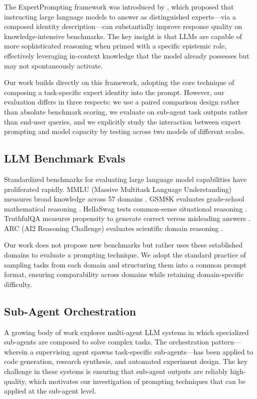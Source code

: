 \documentclass[anonymous, submission, paper]{iclr2026}
\begin{document}
The ExpertPrompting framework was introduced by \citet{expertprompting2023}, which proposed that instructing large language models to answer as distinguished experts---via a composed identity description---can substantially improve response quality on knowledge-intensive benchmarks. The key insight is that LLMs are capable of more sophisticated reasoning when primed with a specific epistemic role, effectively leveraging in-context knowledge that the model already possesses but may not spontaneously activate.

Our work builds directly on this framework, adopting the core technique of composing a task-specific expert identity into the prompt. However, our evaluation differs in three respects: we use a paired comparison design rather than absolute benchmark scoring, we evaluate on sub-agent task outputs rather than end-user queries, and we explicitly study the interaction between expert prompting and model capacity by testing across two models of different scales.

\subsection{LLM Benchmark Evals}
\label{sec:llm_benchmarks}

Standardized benchmarks for evaluating large language model capabilities have proliferated rapidly. MMLU (Massive Multitask Language Understanding) measures broad knowledge across 57 domains \citep{hendrycks2020mmlu}. GSM8K evaluates grade-school mathematical reasoning \citep{cobbe2021gsm8k}. HellaSwag tests common-sense situational reasoning \citep{zellers2019hellaswag}. TruthfulQA measures propensity to generate correct versus misleading answers \citep{lin2021truthfulqa}. ARC (AI2 Reasoning Challenge) evaluates scientific domain reasoning \citep{clark2018arc}.

Our work does not propose new benchmarks but rather uses these established domains to evaluate a prompting technique. We adopt the standard practice of sampling tasks from each domain and structuring them into a common prompt format, ensuring comparability across domains while retaining domain-specific difficulty.

\subsection{Sub-Agent Orchestration}
\label{sec:subagent_orchestration}

A growing body of work explores multi-agent LLM systems in which specialized sub-agents are composed to solve complex tasks. The orchestration pattern---wherein a supervising agent spawns task-specific sub-agents---has been applied to code generation, research synthesis, and automated experiment design. The key challenge in these systems is ensuring that sub-agent outputs are reliably high-quality, which motivates our investigation of prompting techniques that can be applied at the sub-agent level.
\end{document}
